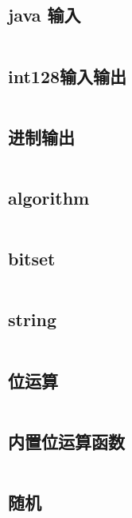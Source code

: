 \subsection{java 输入} 

\inputminted{java}{code/read.java}

\subsection{int128输入输出} 

\inputminted{cpp}{code/int128.cc}

\subsection{进制输出} 

\inputminted{cpp}{code/进制输出.cc}

\subsection{algorithm} 

\inputminted{cpp}{code/algorithm库.cc}

\subsection{bitset} 

\inputminted{text}{code/bitset.txt}

\subsection{string} 

\inputminted{cpp}{code/string.cc}

\subsection{位运算} 

\inputminted{cpp}{code/bitOperation.cc}

\subsection{内置位运算函数} 

\inputminted{text}{code/builtinBitFunction.txt}

\subsection{随机} 

